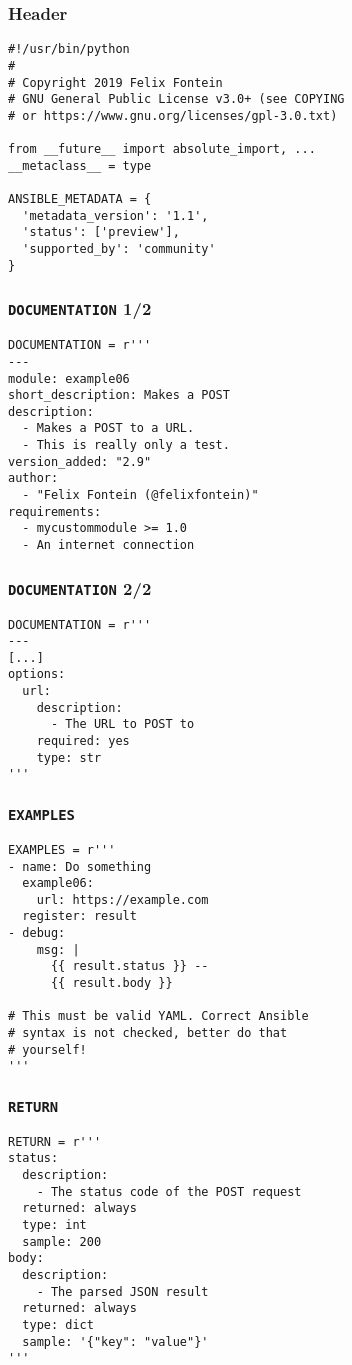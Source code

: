 \documentclass{beamer}
\begin{document}
  \begin{frame}[fragile]
    \frametitle{Header}
\begin{lstlisting}
#!/usr/bin/python
#
# Copyright 2019 Felix Fontein
# GNU General Public License v3.0+ (see COPYING
# or https://www.gnu.org/licenses/gpl-3.0.txt)

from __future__ import absolute_import, ...
__metaclass__ = type

ANSIBLE_METADATA = {
  'metadata_version': '1.1',
  'status': ['preview'],
  'supported_by': 'community'
}
\end{lstlisting}
  \end{frame}

  \begin{frame}[fragile]
    \frametitle{\lstinline{DOCUMENTATION} 1/2}
\begin{lstlisting}[showstringspaces=false]
DOCUMENTATION = r'''
---
module: example06
short_description: Makes a POST
description:
  - Makes a POST to a URL.
  - This is really only a test.
version_added: "2.9"
author:
  - "Felix Fontein (@felixfontein)"
requirements:
  - mycustommodule >= 1.0
  - An internet connection
\end{lstlisting}
  \end{frame}

  \begin{frame}[fragile]
    \frametitle{\lstinline{DOCUMENTATION} 2/2}
\begin{lstlisting}[showstringspaces=false]
DOCUMENTATION = r'''
---
[...]
options:
  url:
    description:
      - The URL to POST to
    required: yes
    type: str
'''
\end{lstlisting}
  \end{frame}

  \begin{frame}[fragile]
    \frametitle{\lstinline{EXAMPLES}}
\begin{lstlisting}[showstringspaces=false]
EXAMPLES = r'''
- name: Do something
  example06:
    url: https://example.com
  register: result
- debug:
    msg: |
      {{ result.status }} --
      {{ result.body }}

# This must be valid YAML. Correct Ansible
# syntax is not checked, better do that
# yourself!
'''
\end{lstlisting}
  \end{frame}

  \begin{frame}[fragile]
    \frametitle{\lstinline{RETURN}}
\begin{lstlisting}[showstringspaces=false]
RETURN = r'''
status:
  description:
    - The status code of the POST request
  returned: always
  type: int
  sample: 200
body:
  description:
    - The parsed JSON result
  returned: always
  type: dict
  sample: '{"key": "value"}'
'''
\end{lstlisting}
  \end{frame}
\end{document}
